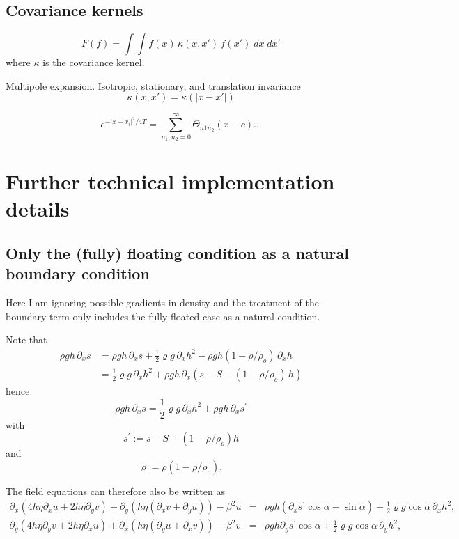 \documentclass[10pt,a4paper]{book}
\newcommand{\p}{\partial}
\begin{document}
\section{Covariance kernels}

\[
F(f)= \int \int f(x) \, \kappa(x,x') \, f(x') \;dx \; dx' 
\]
where $\kappa$ is the covariance kernel.

Multipole expansion.  Isotropic, stationary, and translation
invariance
\[
\kappa(x,x')=\kappa(|x-x'|)
\]

\[e^{-|x-x_i|^2/4T}=\sum_{n_1,n_2=0}^{\infty} \Theta_{n1 n_2} (x-c) ...
\]



\chapter{Further technical implementation details}
 
\section{Only the (fully) floating condition as a natural boundary condition}

Here I am ignoring possible gradients in density and the treatment of
the boundary term only includes the fully floated case as a natural condition.


Note that
\begin{align*}
\rho g h \, \p_x s &=\rho g h \, \p_x s + \frac{1}{2} \varrho g \,\p_x h^2 - \rho g h (1-\rho/\rho_o)\, \p_x h \\
&=\frac{1}{2} \varrho g \,\p_x h^2 +\rho g h \, \p_x ( s -S - (1-\rho/\rho_o)\,  h )
\end{align*}
hence
\begin{equation}
\rho g h \, \p_x s =\frac{1}{2} \varrho g \,\p_x h^2 +\rho g h \, \p_x s^{'}
\label{eq:sdot}
\end{equation}
with
\[ 
s^{'} := s-S -(1-\rho/\rho_o) h 
 \]
and
\[
\varrho=\rho (1-\rho/\rho_o) ,
\]


The field equations can therefore also be written as
\begin{eqnarray} 
\p_x ( 4 h \eta \p_x u + 2 h \eta \p_y v) + \p_y ( h \eta (\p_x v + \p_y u)) - \beta^2 u 
&=&\rho g h (\p_x s^{'} \cos \alpha  -  \sin \alpha )    + \frac{1}{2} \varrho g  \cos \alpha \, \p_x h^2,\nonumber \\
\p_y ( 4 h \eta \p_y v + 2 h \eta \p_x u) +\p_x ( h \eta (\p_y u + \p_x v)) - \beta^2 v 
&=&\rho g h \p_y s^{'} \cos \alpha  +\frac{1}{2} \varrho g  \cos \alpha \, \p_y h^2 , \nonumber
\end{eqnarray}
\end{document}
